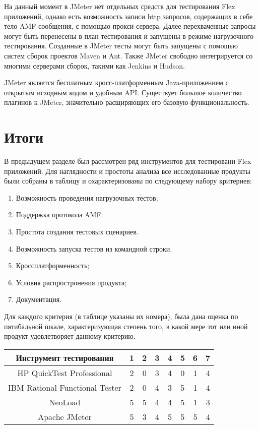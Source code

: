 На данный момент в JMeter нет отдельных средств для тестирования Flex приложений, 
однако есть возможность записи http запросов, содержащих в себе тело AMF 
сообщения, с помощью прокси-сервера. Далее перехваченные запросы могут быть 
перенесены в план тестирования и запущены в режиме нагрузочного тестирования. 
Созданные в JMeter тесты могут быть запущены с помощью систем сборок проектов Maven и 
Ant. Также JMeter свободно интегрируется со многими серверами сборок, такими как Jenkins 
и Hudson.

JMeter является бесплатным кросс-платформенным Java-приложением с открытым
исходным кодом и удобным API. Существует большое количество плагинов к JMeter, 
значительно расщиряющих его базовую функциональность.

\section*{Итоги}
В предыдущем разделе был рассмотрен ряд инструментов для тестировани Flex приложений.
Для наглядности и простоты анализа все исследованные продукты были собраны в таблицу и 
охарактеризованы по следующему набору критериев:

\begin{enumerate}
\item Возможность проведения нагрузочных тестов; 
\item Поддержка протокола AMF.
\item Простота создания тестовых сценариев.
\item Возможность запуска тестов из командной строки.
\item Кроссплатформенность;
\item Условия распростронения продукта;
\item Документация.
\end{enumerate}

Для каждого критерия (в таблице указаны их номера), была дана оценка по пятибальной шкале, 
характеризующая степень того, в какой мере тот или иной продукт удовлетворяет данному критерию.

\begin{tabular}{|c|c|c|c|c|c|c|c|}
\hline 
Инструмент тестирования & 1 & 2 & 3 & 4 & 5 & 6 & 7\\
\hline 
HP QuickTest Professional & 2 & 0 & 3 & 4 & 0 & 1 & 4\\
\hline 
IBM Rational Functional Tester & 2 & 0 & 4 & 3 & 5 & 1 & 4\\
\hline 
NeoLoad & 5 & 5 & 4 & 4 & 5 & 1 & 3\\
\hline 
Apache JMeter & 5 & 3 & 4 & 5 & 5 & 5 & 4\\
\hline 
\end{tabular} 

